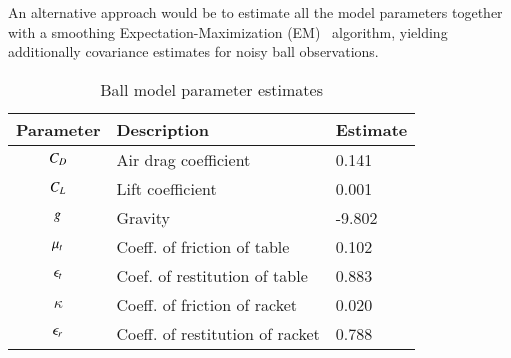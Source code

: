 An alternative approach would be to estimate all the model parameters together with a smoothing Expectation-Maximization (EM)~\citep{Shumway82} algorithm, yielding additionally covariance estimates for noisy ball observations. 
%
\begin{table}[b!]
	\small\sf %
	\caption{Ball model parameter estimates}
	\label{tableEstimates}
	\begin{tabular}{c|l|l}
		\toprule
		\bfseries Parameter & \bfseries Description & \bfseries Estimate \\ %
		\midrule
		$C_{D}$ & Air drag coefficient & 0.141 \\
		$C_{L}$ & Lift coefficient & 0.001 \\
		$g$ & Gravity & -9.802 \\
		$\mu_t$ & Coeff. of friction of table & 0.102 \\
		$\epsilon_t$ & Coef. of restitution of table & 0.883 \\
		$\kappa$ & Coeff. of friction of racket & 0.020 \\
		$\epsilon_r$ & Coeff. of restitution of racket & 0.788 
	\end{tabular}
\end{table}